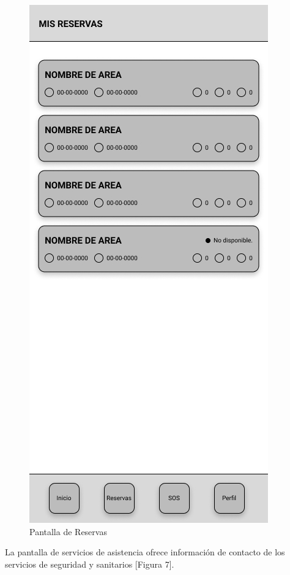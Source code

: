 \documentclass{scrartcl}
\begin{document}
        \begin{figure}[H]
            \centerline{\includegraphics[scale=0.20]{wirebooks}}
            \caption{Pantalla de Reservas}
            \label{fig:wirebooks}
        \end{figure}
        La pantalla de servicios de asistencia ofrece información de contacto de los
        servicios de seguridad y sanitarios [Figura 7].
\end{document}
